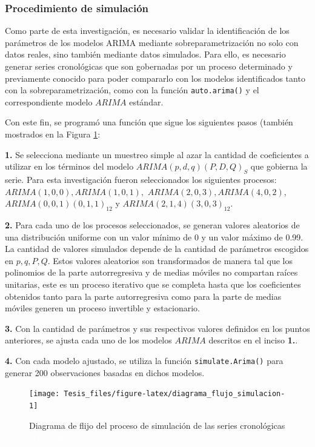 \documentclass[
]{article}
\begin{document}
\subsubsection{Procedimiento de simulación}

Como parte de esta investigación, es necesario validar la identificación
de los parámetros de los modelos ARIMA mediante sobreparametrización no
solo con datos reales, sino también mediante datos simulados. Para ello,
es necesario generar series cronológicas que son gobernadas por un
proceso determinado y previamente conocido para poder compararlo con los
modelos identificados tanto con la sobreparametrización, como con la
función \texttt{auto.arima()} y el correspondiente modelo \(ARIMA\)
estándar.

Con este fin, se programó una función que sigue los siguientes pasos
(también mostrados en la Figura \ref{fig:diagrama_flujo_simulacion}:

\textbf{1.} Se selecciona mediante un muestreo simple al azar la
cantidad de coeficientes a utilizar en los términos del modelo
\(ARIMA(p,d,q)(P,D,Q)_S\) que gobierna la serie. Para esta investigación
fueron seleccionados los siguientes procesos:
\(ARIMA(1,0,0), ARIMA(1,0,1),\) \(ARIMA(2,0,3), ARIMA(4,0,2),\)
\(ARIMA(0,0,1)(0,1,1)_{12}\) y \(ARIMA(2,1,4)(3,0,3)_{12}\).

\textbf{2.} Para cada uno de los procesos seleccionados, se generan
valores aleatorios de una distribución uniforme con un valor mínimo de 0
y un valor máximo de 0.99. La cantidad de valores simulados depende de
la cantidad de parámetros escogidos en \(p, q, P, Q\). Estos valores
aleatorios son transformados de manera tal que los polinomios de la
parte autorregresiva y de medias móviles no compartan raíces unitarias,
este es un proceso iterativo que se completa hasta que los coeficientes
obtenidos tanto para la parte autorregresiva como para la parte de
medias móviles generen un proceso invertible y estacionario.

\textbf{3.} Con la cantidad de parámetros y sus respectivos valores
definidos en los puntos anteriores, se ajusta cada uno de los modelos
\(ARIMA\) descritos en el inciso \textbf{1.}.

\textbf{4.} Con cada modelo ajustado, se utiliza la función
\texttt{simulate.Arima()} para generar 200 observaciones basadas en
dichos modelos.

\begin{figure}[H]
\texttt{[image: Tesis\_files/figure-latex/diagrama\_flujo\_simulacion-1]} \caption{Diagrama de flijo del proceso de simulación de las series cronológicas \textcolor{white}{prueba de aaaaaaaaaaaaaaaaaaaaaaa}}\label{fig:diagrama_flujo_simulacion}
\end{figure}
\end{document}
